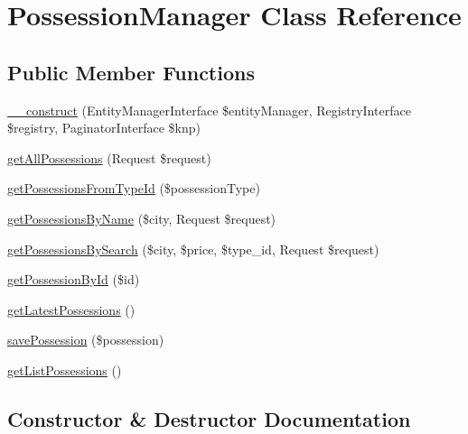\hypertarget{class_app_1_1_b_l_1_1_possession_manager}{}\section{Possession\+Manager Class Reference}
\label{class_app_1_1_b_l_1_1_possession_manager}
\subsection*{Public Member Functions}
\begin{DoxyCompactItemize}
\item 
\mbox{\hyperlink{class_app_1_1_b_l_1_1_possession_manager_ad73db141aaa66e624ca341d8ad805e75}{\+\_\+\+\_\+construct}} (Entity\+Manager\+Interface \$entity\+Manager, Registry\+Interface \$registry, Paginator\+Interface \$knp)
\item 
\mbox{\hyperlink{class_app_1_1_b_l_1_1_possession_manager_ae63d0ba2c09567e642f5bec9cf9bc352}{get\+All\+Possessions}} (Request \$request)
\item 
\mbox{\hyperlink{class_app_1_1_b_l_1_1_possession_manager_a060939c25627379c2016d7ec9efda4c1}{get\+Possessions\+From\+Type\+Id}} (\$possession\+Type)
\item 
\mbox{\hyperlink{class_app_1_1_b_l_1_1_possession_manager_a779ab2d1dec91b1014ca19aeebefd7bb}{get\+Possessions\+By\+Name}} (\$city, Request \$request)
\item 
\mbox{\hyperlink{class_app_1_1_b_l_1_1_possession_manager_acc8fcda735bd6aee13e1855d65ad2c42}{get\+Possessions\+By\+Search}} (\$city, \$price, \$type\+\_\+id, Request \$request)
\item 
\mbox{\hyperlink{class_app_1_1_b_l_1_1_possession_manager_ae4ec518ac8f179af6c4bd26427744ee7}{get\+Possession\+By\+Id}} (\$id)
\item 
\mbox{\hyperlink{class_app_1_1_b_l_1_1_possession_manager_a0556206f7a185ac6fcb4a038c21efe22}{get\+Latest\+Possessions}} ()
\item 
\mbox{\hyperlink{class_app_1_1_b_l_1_1_possession_manager_ae819e57682c3d821eb58dc48c10b0f3d}{save\+Possession}} (\$possession)
\item 
\mbox{\hyperlink{class_app_1_1_b_l_1_1_possession_manager_a4f4dfb956c9d78f8a141ed33b9710764}{get\+List\+Possessions}} ()
\end{DoxyCompactItemize}


\subsection{Constructor \& Destructor Documentation}
\mbox{\label{class_app_1_1_b_l_1_1_possession_manager_ad73db141aaa66e624ca341d8ad805e75}} 
